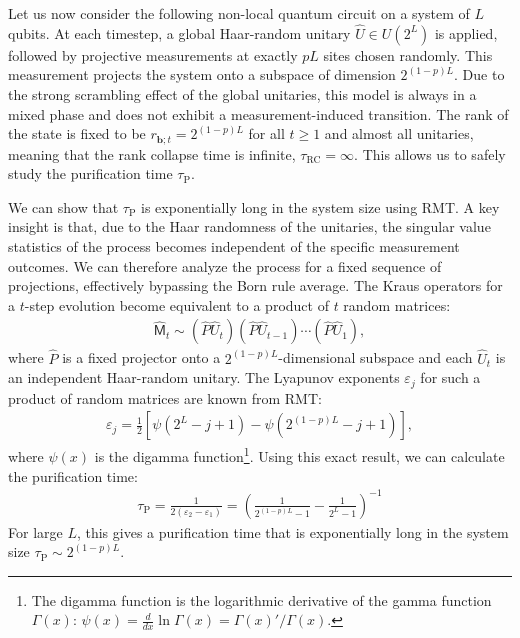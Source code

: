 \documentclass[preprint,pteplogo]{ptephy_v2}%
\numberwithin{equation}{section}
\theoremstyle{definition}
\begin{document}
Let us now consider the following non-local quantum circuit on a system of $L$ qubits.
At each timestep, a global Haar-random unitary $\hat{U}\in U(2^L)$ is applied, followed by projective measurements at exactly $pL$ sites chosen randomly.
This measurement projects the system onto a subspace of dimension $2^{(1-p)L}$.
Due to the strong scrambling effect of the global unitaries, this model is always in a mixed phase and does not exhibit a measurement-induced transition.
The rank of the state is fixed to be $r_{\bm{b};t}=2^{(1-p)L}$ for all $t\geq 1$ and almost all unitaries, meaning that the rank collapse time is infinite, $\tau_{\mathrm{RC}}=\infty$.
This allows us to safely study the purification time $\tau_\mathrm{P}$.

We can show that $\tau_\mathrm{P}$ is exponentially long in the system size using RMT.
A key insight is that, due to the Haar randomness of the unitaries, the singular value statistics of the process becomes independent of the specific measurement outcomes.
We can therefore analyze the process for a fixed sequence of projections, effectively bypassing the Born rule average.
The Kraus operators for a $t$-step evolution become equivalent to a product of $t$ random matrices:
\begin{align}
    \hat{\mathsf{M}}_t \sim (\hat{P}\hat{U}_t)(\hat{P}\hat{U}_{t-1})\cdots(\hat{P}\hat{U}_1),
\end{align}
where $\hat{P}$ is a fixed projector onto a $2^{(1-p)L}$-dimensional subspace and each $\hat{U}_t$ is an independent Haar-random unitary.
The Lyapunov exponents $\varepsilon_j$ for such a product of random matrices are known from RMT:
\begin{align}
    \varepsilon_j = \frac{1}{2}[\psi(2^L-j+1) - \psi(2^{(1-p)L}-j+1)],
\end{align}
where $\psi(x)$ is the digamma function\footnote{
The digamma function is the logarithmic derivative of the gamma function $\Gamma(x)$: $\psi(x) = \frac{d}{dx}\ln \Gamma(x) = \Gamma(x)'/\Gamma(x)$.
}.
Using this exact result, we can calculate the purification time:
\begin{align}
    \tau_\mathrm{P} = \frac{1}{2(\varepsilon_2-\varepsilon_1)}
    =\left(\frac{1}{2^{(1-p)L}-1} - \frac{1}{2^L-1}\right)^{-1}
\end{align}
For large $L$, this gives a purification time that is exponentially long in the system size $\tau_\mathrm{P}\sim 2^{(1-p)L}$.
\end{document}
